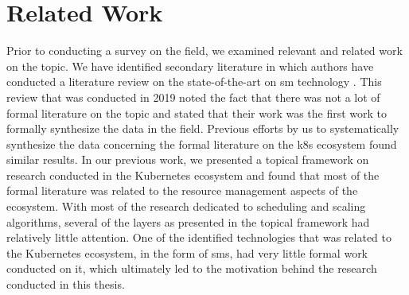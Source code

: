 \section{Related Work}
\label{sec:survey:related-work}

Prior to conducting a survey on the field, we examined relevant and related work on the topic. We have identified secondary literature in which authors have conducted a literature review on the state-of-the-art on \gls{sm} technology \cite{service-mesh-survey}. This review that was conducted in 2019 noted the fact that there was not a lot of formal literature on the topic and stated that their work was the first work to formally synthesize the data in the field. Previous efforts by us to systematically synthesize the data concerning the formal literature on the \gls{k8s} ecosystem found similar results. In our previous work, we presented a topical framework on research conducted in the Kubernetes ecosystem and found that most of the formal literature was related to the resource management aspects of the ecosystem. With most of the research dedicated to scheduling and scaling algorithms, several of the layers as presented in the topical framework had relatively little attention. One of the identified technologies that was related to the Kubernetes ecosystem, in the form of \glspl{sm}, had very little formal work conducted on it, which ultimately led to the motivation behind the research conducted in this thesis.

